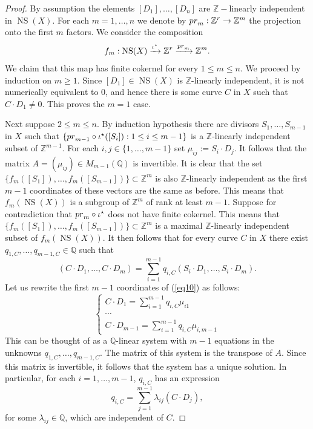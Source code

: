 \documentclass[10pt,a4paper]{amsart}
\newcommand{\NS}{{\operatorname{NS}}}
\newcommand{\Q}{{\mathbb Q}}
\newcommand{\Z}{{\mathbb Z}}
\newcommand{\pr}{{\rm{pr}}}
\begin{document}
\begin{proof} 
By assumption the elements $[D_1],\ldots, [D_n]$ are $\Z-$linearly independent in $\NS(X)$. For each $m=1,\ldots, n$ we denote by $\pr_m:\Z^r\to\Z^m$ the projection onto the first $m$ factors. We consider the composition 
\[f_m:\NS(X)\xrightarrow{\iota^\star}\Z^r\xrightarrow{\pr_m}\Z^m.\]
We claim that this map has finite cokernel for every $1\leq m\leq n$. 
We proceed by induction on $m\geq 1$. Since $[D_1]\in \NS(X)$ is $\Z$-linearly independent, it is not numerically equivalent to $0$, and hence there is some curve $C$ in $X$ such that $C\cdot D_1\neq 0$. This proves the $m=1$ case. 

Next suppose $2\leq m\leq n$. By induction hypothesis there are divisors $S_1,\ldots, S_{m-1}$ in $X$ such that $\{\pr_{m-1}\circ\iota^\star([S_i]):1\leq i\leq m-1\}$ is a $\Z$-linearly independent subset of $\Z^{m-1}$. For each $i, j\in\{1,\ldots, m-1\}$ set $\mu_{ij}:=S_i\cdot D_j$. It follows that the matrix $A=(\mu_{ij})\in M_{m-1}(\Q)$ is invertible. It is clear that the set $\{f_{m}([S_1]),\ldots, f_{m}([S_{m-1}])\}\subset\Z^{m}$ is also $\Z$-linearly independent as the first $m-1$ coordinates of these vectors are the same as before. This means that $f_m(\NS(X))$ is a subgroup of $\Z^m$ of rank at least $m-1$. Suppose for contradiction that $\pr_m\circ\iota^\star$ does not have finite cokernel. This means that $\{f_{m}([S_1]),\ldots, f_{m}([S_{m-1}])\}\subset\Z^{m}$ is a maximal $\Z$-linearly independent subset of $f_m(\NS(X))$. It then follows that for every curve $C$ in $X$ there exist $q_{1,C},\ldots, q_{m-1,C}\in\Q$ such that 
\begin{equation}\label{eq10}
    (C\cdot D_1,\ldots, C\cdot D_m)=\sum_{i=1}^{m-1} q_{i,C}(S_i\cdot D_1,\ldots, S_i\cdot D_m).
\end{equation}
Let us rewrite the first $m-1$ coordinates of (\ref{eq10}) as follows: 
\[
\left\{\begin{array}{c}
    C\cdot D_1=\sum_{i=1}^{m-1} q_{i,C}\mu_{i1}   \\
     \cdots\\
     C\cdot D_{m-1}=\sum_{i=1}^{m-1} q_{i,C}\mu_{i,m-1}
\end{array}\right.
\] This can be thought of as a $\Q$-linear system with $m-1$ equations in the unknowns $q_{1,C},\ldots, q_{m-1,C}$. The matrix of this system is the transpose of $A$. Since this matrix is invertible, it follows that the system has a unique solution. In particular, for each $i=1,\ldots, m-1$, $q_{i,C}$ has an expression 
\begin{equation}
    q_{i,C}=\sum_{j=1}^{m-1}\lambda_{ij} (C\cdot D_j),
\end{equation} for some $\lambda_{ij}\in\Q$, which are independent of $C$. 


\end{proof}
\end{document}
